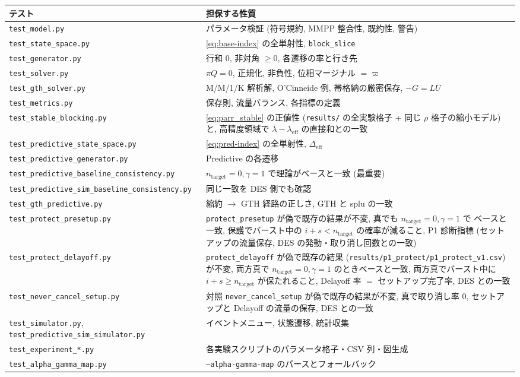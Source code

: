 \documentclass[a4paper,11pt]{article}
\newcommand{\code}[1]{\texttt{#1}}
\newcommand{\eff}{\mathrm{eff}}
\begin{document}
\begin{longtable}{p{}p{}}
\toprule
テスト & 担保する性質 \\
\midrule
\endhead
\code{test\_model.py} & パラメータ検証 (符号規約, MMPP 整合性, 既約性, 警告) \\
\code{test\_state\_space.py} & \eqref{eq:base-index} の全単射性, \code{block\_slice} \\
\code{test\_generator.py} & 行和 $0$, 非対角 $\ge0$, 各遷移の率と行き先 \\
\code{test\_solver.py} & $\pi Q=0$, 正規化, 非負性, 位相マージナル $=\varpi$ \\
\code{test\_gth\_solver.py} & M/M/1/K 解析解, O'Cinneide 例, 帯格納の厳密保存, $-G=LU$ \\
\code{test\_metrics.py} & 保存則, 流量バランス, 各指標の定義 \\
\code{test\_stable\_blocking.py} & \eqref{eq:parr_stable} の正値性 (\code{results/} の全実験格子 + 同じ $\rho$ 格子の縮小モデル) と, 高精度領域で $\bar\lambda-\lambda_\eff$ の直接和との一致 \\
\code{test\_predictive\_state\_space.py} & \eqref{eq:pred-index} の全単射性, $\Delta_{\eff}$ \\
\code{test\_predictive\_generator.py} & Predictive の各遷移 \\
\code{test\_predictive\_baseline\_consistency.py}
  & $n_{\mathrm{target}}=0,\gamma=1$ で理論がベースと一致 (最重要) \\
\code{test\_predictive\_sim\_baseline\_consistency.py}
  & 同じ一致を DES 側でも確認 \\
\code{test\_gth\_predictive.py} & 縮約 $\to$ GTH 経路の正しさ, GTH と splu の一致 \\
\code{test\_protect\_presetup.py}
  & \code{protect\_presetup} が偽で既存の結果が不変, 真でも $n_{\mathrm{target}}=0,\gamma=1$ で
    ベースと一致, 保護でバースト中の $i+s<n_{\mathrm{target}}$ の確率が減ること,
    P1 診断指標 (セットアップの流量保存, DES の発動・取り消し回数との一致) \\
\code{test\_protect\_delayoff.py}
  & \code{protect\_delayoff} が偽で既存の結果 (\code{results/p1\_protect/p1\_protect\_v1.csv}) が不変,
    両方真で $n_{\mathrm{target}}=0,\gamma=1$ のときベースと一致,
    両方真でバースト中に $i+s\ge n_{\mathrm{target}}$ が保たれること,
    Delayoff 率 $=$ セットアップ完了率, DES との一致 \\
\code{test\_never\_cancel\_setup.py}
  & 対照 \code{never\_cancel\_setup} が偽で既存の結果が不変, 真で取り消し率 $0$,
    セットアップと Delayoff の流量の保存, DES との一致 \\
\code{test\_simulator.py}, \code{test\_predictive\_sim\_simulator.py}
  & イベントメニュー, 状態遷移, 統計収集 \\
\code{test\_experiment\_*.py} & 各実験スクリプトのパラメータ格子・CSV 列・図生成 \\
\code{test\_alpha\_gamma\_map.py} & \code{--alpha-gamma-map} のパースとフォールバック \\
\bottomrule
\end{longtable}
\end{document}
